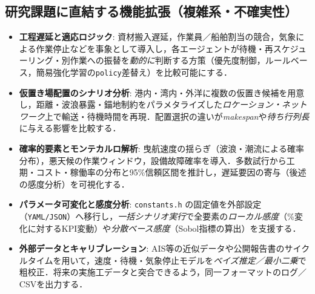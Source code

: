 \documentclass[10pt,letterpaper]{jsarticle}
\begin{document}
\subsection{研究課題に直結する機能拡張（複雑系・不確実性）}
\begin{itemize}
\item \textbf{工程遅延と適応ロジック}: 資材搬入遅延，作業員／船舶割当の競合，気象による作業停止などを事象として導入し，各エージェントが待機・再スケジューリング・別作業への振替を\emph{動的に}判断する方策（優先度制御，ルールベース，簡易強化学習の\texttt{policy}差替え）を比較可能にする．
\item \textbf{仮置き場配置のシナリオ分析}: 港内・湾内・外洋に複数の仮置き候補を用意し，距離・波浪暴露・錨地制約をパラメタライズした\emph{ロケーション・ネットワーク}上で輸送・待機時間を再現．配置選択の違いが\emph{makespan}や\emph{待ち行列長}に与える影響を比較する．
\item \textbf{確率的要素とモンテカルロ解析}: 曳航速度の揺らぎ（波浪・潮流による確率分布），悪天候の作業ウィンドウ，設備故障確率を導入．多数試行から工期・コスト・稼働率の分布と95\%信頼区間を推計し，遅延要因の寄与（後述の感度分析）を可視化する．
\item \textbf{パラメータ可変化と感度分析}: \texttt{constants.h} の固定値を外部設定（\texttt{YAML/JSON}）へ移行し，\emph{一括シナリオ実行}で全要素の\emph{ローカル感度}（\%変化に対するKPI変動）や\emph{分散ベース感度}（Sobol指標の算出）を支援する．
\item \textbf{外部データとキャリブレーション}: AIS等の近似データや公開報告書のサイクルタイムを用いて，速度・待機・気象停止モデルを\emph{ベイズ推定／最小二乗}で粗校正．将来の実施工データと突合できるよう，同一フォーマットのログ／CSVを出力する．
\end{itemize}
\end{document}
